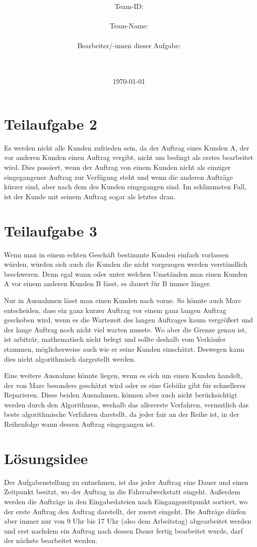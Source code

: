 \documentclass[a4paper,10pt,ngerman]{scrartcl}
\title{\textbf{\Huge\Aufgabe}}
\author{\LARGE Team-ID: \LARGE \TeamId \\\\
\LARGE Team-Name: \LARGE \TeamName \\\\
\LARGE Bearbeiter/-innen dieser Aufgabe: \\
\LARGE \Namen\\\\}
\date{\LARGE\today}
\begin{document}
\maketitle
\tableofcontents

\vspace{0.5cm}

\section{Teilaufgabe 2}\label{sec:begruendung2}
Es werden nicht alle Kunden zufrieden sein, da der Auftrag eines Kunden A, der vor anderen Kunden einen Auftrag vergibt,
nicht um bedingt als erstes bearbeitet wird.
Dies passiert, wenn der Auftrag von einem Kunden
nicht als einziger eingegangener Auftrag zur Verfügung steht und wenn die anderen Aufträge kürzer sind,
aber nach dem des Kunden eingegangen sind.
Im schlimmsten Fall, ist der Kunde mit seinem Auftrag sogar als letztes dran.

\section{Teilaufgabe 3}\label{sec:begruendung3 }
Wenn man in einem echten Geschäft bestimmte Kunden einfach vorlassen würden,
würden sich auch die Kunden die nicht vorgezogen werden verständlich beschweren.
Denn egal wann oder unter welchen Umständen man einen Kunden A 
vor einem anderen Kunden B lässt, es dauert für B immer länger.

Nur in Ausnahmen lässt man einen Kunden nach vorne.
So könnte auch Marc entscheiden, dass ein ganz kurzer Auftrag vor einem ganz langen Auftrag geschoben wird,
wenn es die Wartezeit des langen Auftrages kaum vergrößert
und der lange Auftrag noch nicht viel warten musste.
Wo aber die Grenze genau ist,
ist arbiträr, mathematisch nicht belegt und sollte deshalb vom Verkäufer stammen,
möglicherweise auch wie er seine Kunden einschätzt.
 Deswegen kann dies nicht algorithmisch dargestellt werden.

Eine weitere Ausnahme könnte liegen, wenn es sich um einen Kunden handelt,
der von Marc besonders geschätzt wird oder es eine Gebühr gibt für schnelleres Reparieren.
Diese beiden Ausnahmen, können aber auch nicht berücksichtigt werden durch den Algorithmus,
weshalb das allererste Verfahren, vermutlich das beste algorithmische Verfahren darstellt, da jeder fair an der Reihe ist,
in der Reihenfolge wann dessen Auftrag eingegangen ist.

\section{Lösungsidee}\label{sec:losungsidee}
Der Aufgabenstellung zu entnehmen, ist das jeder Auftrag eine Dauer und einen Zeitpunkt besitzt,
wo der Auftrag in die Fahrradwerkstatt eingeht.
Außerdem werden die Aufträge in den Eingabedateien
nach Eingangszeitpunkt sortiert, wo der erste Auftrag den Auftrag darstellt, der zuerst eingeht.
Die Aufträge dürfen aber immer nur von 9 Uhr bis 17 Uhr (also dem Arbeitstag) abgearbeitet werden
und erst nachdem ein Auftrag
nach dessen Dauer fertig bearbeitet wurde, darf der nächste bearbeitet werden.
\end{document}
